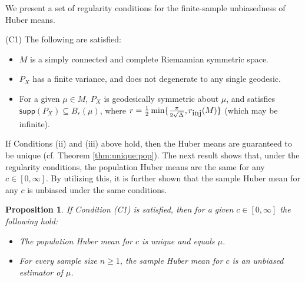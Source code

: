 \documentclass[preprint]{imsart}
\theoremstyle{plain}
\newtheorem{example}{Example}
\newtheorem{proposition}{Proposition}
\theoremstyle{remark}
\begin{document}


We present a set of regularity conditions for the finite-sample unbiasedness of Huber means.

\indent (C1) The following are satisfied: 
\begin{itemize}
\item[(i)] $M$ is a simply connected and complete Riemannian symmetric space.
\item[(ii)] $P_{X}$ has a finite variance, and does not degenerate to any single geodesic.
\item[(iii)] For a given $\mu \in M$, $P_{X}$ is geodesically symmetric about $\mu$, and satisfies $\textsf{supp}(P_{X}) \subseteq B_{r}(\mu)$, where $r = \frac{1}{2}\min\{\frac{\pi}{2\sqrt{\Delta}}, r_{\mbox{\tiny inj}}(M)\}$ (which may be infinite). 
\end{itemize}


If Conditions (ii) and (iii) above hold, then the Huber means are guaranteed to be unique (cf. Theorem \ref{thm:unique:pop}). 
The next result shows that, under the regularity conditions, the population Huber means are the same for any $c \in [0, \infty]$. By utilizing this, it is further shown that the sample Huber mean for any $c$ is unbiased under the same conditions. 


\begin{proposition}\label{prop:unbiased}
If Condition (C1) is satisfied, then for a given $c \in [0, \infty]$ the following hold:
\begin{itemize} 
\item[(a)] The population Huber mean for $c$ is unique and equals $\mu$.  
\item[(b)] For every sample size $n \ge 1$, the sample Huber mean for $c$ is an unbiased estimator of $\mu$.
\end{itemize}
\end{proposition}
\end{document}
